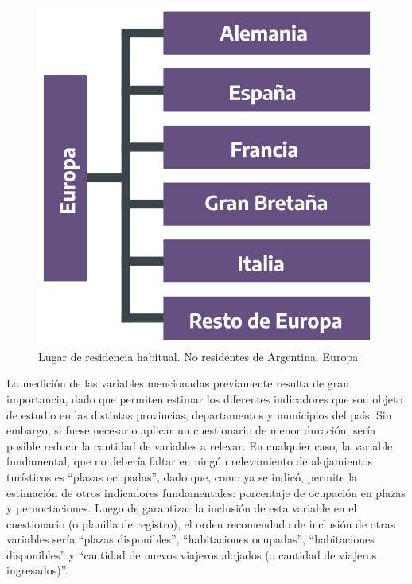 \documentclass[
]{book}
\begin{document}
\begin{figure}

{\centering \includegraphics[width=1\linewidth]{imagenes/figura_2_2_2} 

}

\caption{Lugar de residencia habitual. No residentes de Argentina. Europa}\label{fig:europa}
\end{figure}

La medición de las variables mencionadas previamente resulta de gran importancia, dado que permiten estimar los diferentes indicadores que son objeto de estudio en las distintas provincias, departamentos y municipios del país. Sin embargo, si fuese necesario aplicar un cuestionario de menor duración, sería posible reducir la cantidad de variables a relevar. En cualquier caso, la variable fundamental, que no debería faltar en ningún relevamiento de alojamientos turísticos es ``plazas ocupadas'', dado que, como ya se indicó, permite la estimación de otros indicadores fundamentales: porcentaje de ocupación en plazas y pernoctaciones. Luego de garantizar la inclusión de esta variable en el cuestionario (o planilla de registro), el orden recomendado de inclusión de otras variables sería ``plazas disponibles'', ``habitaciones ocupadas'', ``habitaciones disponibles'' y ``cantidad de nuevos viajeros alojados (o cantidad de viajeros ingresados)''.
\end{document}
